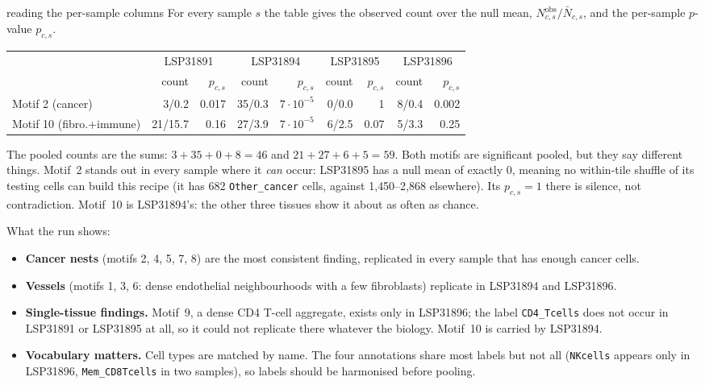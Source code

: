 \documentclass[11pt,a4paper]{article}
\theoremstyle{remark}
\newcommand{\obs}{\mathrm{obs}}
\begin{document}
\begin{example}{reading the per-sample columns}
For every sample $s$ the table gives the observed count over the null mean,
$N^{\obs}_{c,s}/\bar N_{c,s}$, and the per-sample $p$-value $p_{c,s}$.
\begin{center}
\small
\begin{tabular}{lrrrrrrrr}
\toprule
& \multicolumn{2}{c}{LSP31891} & \multicolumn{2}{c}{LSP31894} & \multicolumn{2}{c}{LSP31895} & \multicolumn{2}{c}{LSP31896} \\
& count & $p_{c,s}$ & count & $p_{c,s}$ & count & $p_{c,s}$ & count & $p_{c,s}$ \\
\midrule
Motif 2 (cancer) & 3/0.2 & 0.017 & 35/0.3 & $7\cdot10^{-5}$ & 0/0.0 & 1 & 8/0.4 & 0.002 \\
Motif 10 (fibro.+immune) & 21/15.7 & 0.16 & 27/3.9 & $7\cdot10^{-5}$ & 6/2.5 & 0.07 & 5/3.3 & 0.25 \\
\bottomrule
\end{tabular}
\end{center}
The pooled counts are the sums: $3+35+0+8=46$ and $21+27+6+5=59$. Both
motifs are significant pooled, but they say different things. Motif~2 stands
out in every sample where it \emph{can} occur: LSP31895 has a null mean of
exactly $0$, meaning no within-tile shuffle of its testing cells can build
this recipe (it has 682 \texttt{Other\_cancer} cells, against 1{,}450--2{,}868
elsewhere). Its $p_{c,s}=1$ there is silence, not contradiction. Motif~10 is
LSP31894's: the other three tissues show it about as often as chance.
\end{example}

What the run shows:
\begin{itemize}[itemsep=2pt]
  \item \textbf{Cancer nests} (motifs 2, 4, 5, 7, 8) are the most consistent
        finding, replicated in every sample that has enough cancer cells.
  \item \textbf{Vessels} (motifs 1, 3, 6: dense endothelial neighbourhoods
        with a few fibroblasts) replicate in LSP31894 and LSP31896.
  \item \textbf{Single-tissue findings.} Motif~9, a dense CD4 T-cell
        aggregate, exists only in LSP31896; the label \texttt{CD4\_Tcells}
        does not occur in LSP31891 or LSP31895 at all, so it could not
        replicate there whatever the biology. Motif~10 is carried by LSP31894.
  \item \textbf{Vocabulary matters.} Cell types are matched by name. The four
        annotations share most labels but not all (\texttt{NKcells} appears
        only in LSP31896, \texttt{Mem\_CD8Tcells} in two samples), so labels
        should be harmonised before pooling.
\end{itemize}
\end{document}
